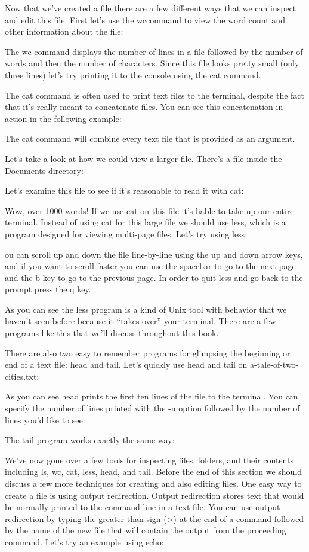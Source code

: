 Now that we’ve created a file there are a few different ways that we can inspect and edit this file. First let’s use the wccommand to view the word count and other information about the file:

The wc command displays the number of lines in a file followed by the number of words and then the number of characters. Since this file looks pretty small (only three lines) let’s try printing it to the console using the cat command.

The cat command is often used to print text files to the terminal, despite the fact that it’s really meant to concatenate files. You can see this concatenation in action in the following example:

The cat command will combine every text file that is provided as an argument.

Let’s take a look at how we could view a larger file. There’s a file inside the Documents directory:

Let’s examine this file to see if it’s reasonable to read it with cat:

Wow, over 1000 words! If we use cat on this file it’s liable to take up our entire terminal. Instead of using cat for this large file we should use less, which is a program designed for viewing multi-page files. Let’s try using less:

ou can scroll up and down the file line-by-line using the up and down arrow keys, and if you want to scroll faster you can use the spacebar to go to the next page and the b key to go to the previous page. In order to quit less and go back to the prompt press the q key.

As you can see the less program is a kind of Unix tool with behavior that we haven’t seen before because it “takes over” your terminal. There are a few programs like this that we’ll discuss throughout this book.

There are also two easy to remember programs for glimpsing the beginning or end of a text file: head and tail. Let’s quickly use head and tail on a-tale-of-two-cities.txt:

As you can see head prints the first ten lines of the file to the terminal. You can specify the number of lines printed with the -n option followed by the number of lines you’d like to see:

The tail program works exactly the same way:

We’ve now gone over a few tools for inspecting files, folders, and their contents including ls, wc, cat, less, head, and tail. Before the end of this section we should discuss a few more techniques for creating and also editing files. One easy way to create a file is using output redirection. Output redirection stores text that would be normally printed to the command line in a text file. You can use output redirection by typing the greater-than sign (>) at the end of a command followed by the name of the new file that will contain the output from the proceeding command. Let’s try an example using echo:

